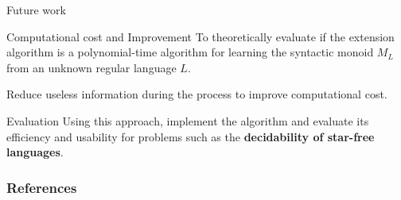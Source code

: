 \documentclass{beamer}
\begin{document}
\begin{frame}{Future work}

\begin{block}{Computational cost and Improvement}
To theoretically evaluate if the extension algorithm is a polynomial-time algorithm for learning the syntactic monoid $M_L$ from an unknown regular language $L$.

Reduce useless information during the process to improve computational cost. 
\end{block}

\begin{block}{Evaluation}
     Using this approach, implement the algorithm and evaluate its efficiency and usability for problems such as the \textbf{decidability of star-free languages}.
\end{block}
\end{frame}

\begin{frame}[allowframebreaks] %
\frametitle{References}


 

\end{frame}
\end{document}
